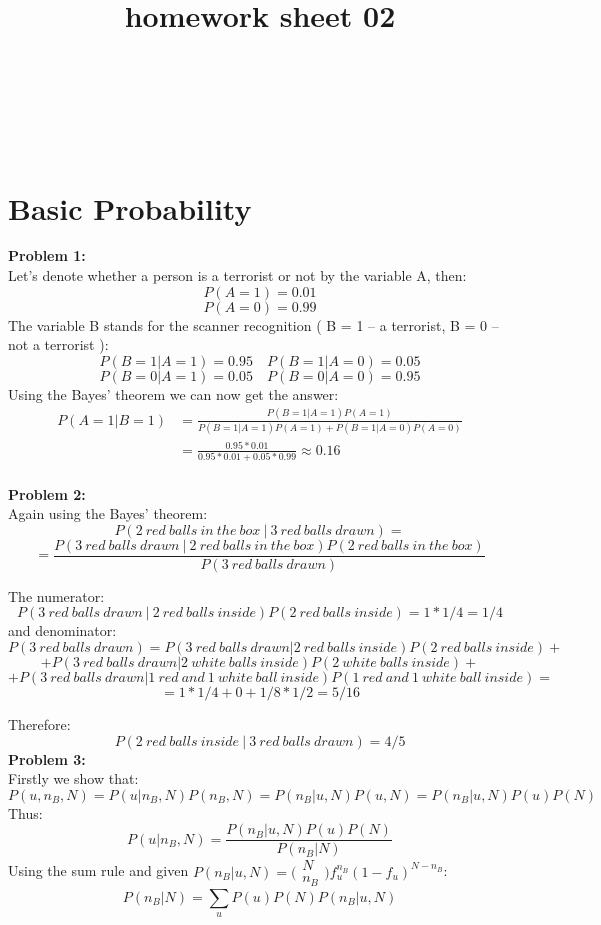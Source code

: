 \documentclass{article}
\title{homework sheet 02}
\author{
\name{Denys Sobchyshak}\\
\imat{03636581}\\
\email{denys.sobchyshak@gmail.com}
\And
\name{Sergey Zakharov} \\
\imat{03636642}\\
\email{ga39pad@mytum.de}
}
\begin{document}
\maketitle

\section{Basic Probability}

\textbf{Problem 1:}\\
Let's denote whether a person is a terrorist or not by the variable A, then:\\
\[P(A = 1) = 0.01\]
\[P(A = 0) = 0.99\]
The variable B stands for the scanner recognition ( B = 1 -- a terrorist, B = 0 -- not a terrorist ):
\[P(B = 1|A = 1) = 0.95 \quad P(B = 1|A = 0) = 0.05\]
\[P(B = 0|A = 1) = 0.05 \quad P(B = 0|A = 0) = 0.95\]
Using the Bayes' theorem we can now get the answer:
\begin{equation*}
	\begin{aligned}
	P(A = 1|B = 1) & = \frac{P(B = 1|A = 1)P(A = 1)}{P(B = 1|A = 1)P(A = 1) + P(B =1|A = 0)P(A = 0)} \\ 
				   &  = \frac{0.95*0.01}{0.95*0.01 + 0.05*0.99} \approx 0.16
	\end{aligned}
\end{equation*}
\\
\textbf{Problem 2:}\\
Again using the Bayes' theorem:
\[ P(2\ red\  balls\ in\ the\ box\ |\ 3\ red\ balls\ drawn) =\]
\[= \frac{P(3\ red\  balls\ drawn\ |\ 2\ red\ balls\ in\ the\ box)P(2\ red\ balls\ in\ the\ box)}{P(3\ red\  balls\ drawn)}\]

The numerator:
\[P(3\ red\  balls\ drawn\ |\ 2\ red\ balls\ inside)P(2\ red\ balls\ inside)=1*1/4=1/4\]
and denominator:
\[P(3\ red\  balls\ drawn)=P(3\ red\  balls\ drawn|2\ red\ balls\ inside)P(2\ red\ balls\ inside)+\]
\[+P(3\ red\  balls\ drawn|2\ white\ balls\ inside)P(2\ white\ balls\ inside)+\]
\[+P(3\ red\  balls\ drawn|1\ red\ and\ 1\ white\ ball\ inside)P(1\ red\ and\ 1\ white\ ball\ inside)=\]
\[=1*1/4+0+1/8*1/2=5/16\]

Therefore:
\[ P(2\ red\  balls\ inside\ |\ 3\ red\ balls\ drawn)=4/5\]
\newpage
\textbf{Problem 3:}\\
Firstly we show that:
\[P(u,n_B,N) = P(u|n_B,N)P(n_B,N) = P(n_B|u,N)P(u,N) = P(n_B|u,N)P(u)P(N)\]
Thus:
\[P(u|n_B,N)=\frac{P(n_B|u,N)P(u)P(N)}{P(n_B|N)} \]
Using the sum rule and given $P(n_{B}|u,N) =\bigl(\begin{smallmatrix}
    N \\
    n_B
  \end{smallmatrix}\bigr)
  f_{u}^{n_B}{(1-f_u)}^{N-n_B}$:\\
\[P(n_{B}|N) = \sum_{u}{P(u)P(N)P(n_{B}|u,N)}\] 
\end{document}
